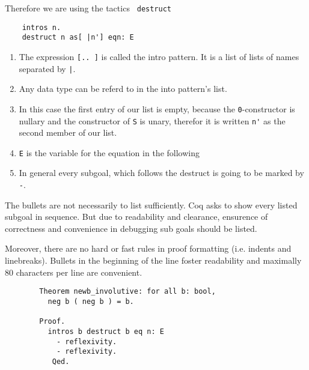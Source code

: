     Therefore we are using the tactics \lstinline! destruct!	
	\begin{lstlisting}
	intros n.
	destruct n as[ |n'] eqn: E
	\end{lstlisting}
	
	\begin{enumerate}
		\item 	The expression \lstinline![.. ]! is called the intro pattern. It is a list of lists of names separated by \lstinline!|!.
		\item   Any data type can be referd to in the into pattern's list.
		\item In this case the first entry of our list is empty, because the \lstinline!0!-constructor is nullary and the constructor of \lstinline!S! is unary, therefor it is written \lstinline!n'! as the second member of our list.
		\item \lstinline!E! is the variable for the equation in the following
		\item In general every subgoal, which follows the destruct is going to be marked by \lstinline!-!.
	\end{enumerate} 
	
	The bullets are not necessarily to list sufficiently. 
	Coq asks to show every listed subgoal in sequence.
	But due to readability and clearance, ensurence of correctness and convenience in debugging sub goals should be listed.
	
	Moreover, there are no hard or fast rules in proof formatting (i.e. indents and linebreaks). 
	Bullets in the beginning of the line foster readability and maximally 80 characters per line are convenient.
	
	\begin{example}
	  \begin{lstlisting}
	  	Theorem newb_involutive: for all b: bool,
	  	  neg b ( neg b ) = b.
	  	  
	  	Proof. 
	  	  intros b destruct b eq n: E
	  	    - reflexivity. 
	  	    - reflexivity. 
	  	   Qed.  
	  \end{lstlisting}
	\end{example}
	 
	 
	
	

   